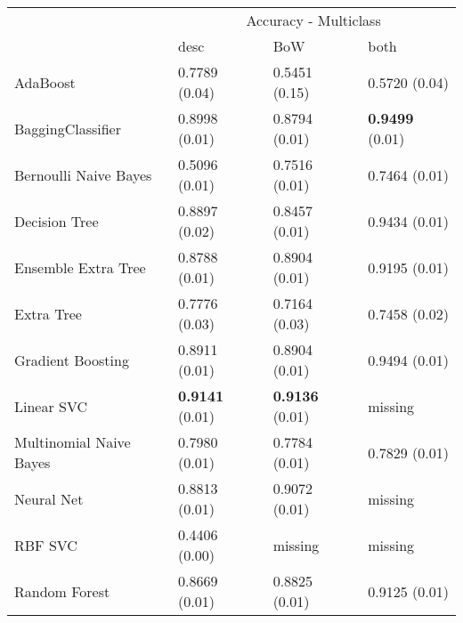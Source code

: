 \begin{tabular}{|l|l|l|l| }
\hline
 &  \multicolumn{3}{c|}{ Accuracy - Multiclass} \\
\cline{2-4} & desc & BoW & both \\ \hline
AdaBoost                & 0.7789 (0.04) & 0.5451 (0.15) & 0.5720 (0.04)\\
BaggingClassifier       & 0.8998 (0.01) & 0.8794 (0.01) & {\bf 0.9499} (0.01)\\
Bernoulli Naive Bayes   & 0.5096 (0.01) & 0.7516 (0.01) & 0.7464 (0.01)\\
Decision Tree           & 0.8897 (0.02) & 0.8457 (0.01) & 0.9434 (0.01)\\
Ensemble Extra Tree     & 0.8788 (0.01) & 0.8904 (0.01) & 0.9195 (0.01)\\
Extra Tree              & 0.7776 (0.03) & 0.7164 (0.03) & 0.7458 (0.02)\\
Gradient Boosting       & 0.8911 (0.01) & 0.8904 (0.01) & 0.9494 (0.01)\\
Linear SVC              & {\bf 0.9141} (0.01) & {\bf 0.9136} (0.01) & missing \\
Multinomial Naive Bayes & 0.7980 (0.01) & 0.7784 (0.01) & 0.7829 (0.01)\\
Neural Net              & 0.8813 (0.01) & 0.9072 (0.01) & missing \\
RBF SVC                 & 0.4406 (0.00) & missing  & missing \\
Random Forest           & 0.8669 (0.01) & 0.8825 (0.01) & 0.9125 (0.01)\\
\hline
\end{tabular}